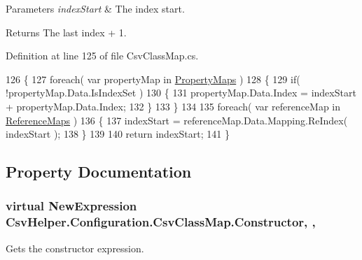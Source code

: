 \begin{DoxyParams}{Parameters}
{\em index\-Start} & The index start.\\
\hline
\end{DoxyParams}
\begin{DoxyReturn}{Returns}
The last index + 1.
\end{DoxyReturn}


Definition at line 125 of file Csv\-Class\-Map.\-cs.


\begin{DoxyCode}
126         \{
127             \textcolor{keywordflow}{foreach}( var propertyMap \textcolor{keywordflow}{in} \hyperlink{a00057_a9580e897abcba144f3101eb983348e25}{PropertyMaps} )
128             \{
129                 \textcolor{keywordflow}{if}( !propertyMap.Data.IsIndexSet )
130                 \{
131                     propertyMap.Data.Index = indexStart + propertyMap.Data.Index;
132                 \}
133             \}
134 
135             \textcolor{keywordflow}{foreach}( var referenceMap \textcolor{keywordflow}{in} \hyperlink{a00057_a6dfbf8f743b16d2ec83edef865ea2d9e}{ReferenceMaps} )
136             \{
137                 indexStart = referenceMap.Data.Mapping.ReIndex( indexStart );
138             \}
139 
140             \textcolor{keywordflow}{return} indexStart;
141         \}
\end{DoxyCode}


\subsection{Property Documentation}
\hypertarget{a00057_ae8038b36db7584ef1a73852fcc46404b}{
\subsubsection[{Constructor}]{\setlength{\rightskip}{0pt plus 5cm}virtual New\-Expression Csv\-Helper.\-Configuration.\-Csv\-Class\-Map.\-Constructor\hspace{0.3cm}{\ttfamily [get]}, {\ttfamily [set]}, {\ttfamily [inherited]}}}\label{a00057_ae8038b36db7584ef1a73852fcc46404b}


Gets the constructor expression. 



